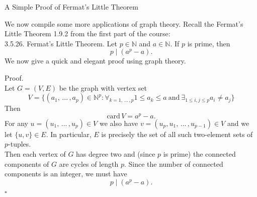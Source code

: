 \documentclass[smaller,hyperref={CJKbookmarks=true}]{beamer}
\newcommand{\N}{\mathbb{N}} \newcommand{\Z}{\mathbb{Z}} \newcommand{\Q}{\mathbb{Q}}
\newenvironment{PROOF}{{\noindent\!\sf\alert{Proof.}}\\}{\hfill$\square$\\}
\newcounter{zhuo}[subsection]
\begin{document}
\begin{frame}{A Simple Proof of Fermat's Little Theorem}
\begin{spacing}{1.05}
\vspace*{11pt}
We now compile some more applications of graph theory. Recall the
Fermat's Little Theorem 1.9.2 from the first part of the course:\\[6pt]
\alert{3.5.26. Fermat's Little Theorem.} Let $p\in\N$ and $a\in\N$. If $p$ is prime, then
\begin{equation}\label{3.5.4}
p\mid(a^p-a).
\end{equation}
We now give a quick and elegant proof using graph theory.
\end{spacing}
\newpage
\begin{spacing}{0.9}
\begin{PROOF}
Let $G=(V,E)$ be the graph with vertex set
\[V=\Big\{(a_1,\,...\,,a_p)\in\N^p\!:\mathop{\forall}_{k=1,\,...\,,p}
1\leq a_k\leq a~\text{and}~\mathop{\exists}_{1\leq i,j\leq p}a_i\neq a_j\Big\}\]
Then
\[\text{card}\,V=a^p-a.\]
For any $u=(u_1,\,...\,,u_p)\in V$ we also have $v=(u_p,u_1,\,...\,,u_{p-1})\in V$ and we let $\{u,v\}\in E$. In particular, $E$ is precisely the set of all such two-element sets of $p$-tuples.\\
Then each vertex of $G$ has degree two and (since $p$ is prime) the
connected components of $G$ are cycles of length $p$. Since the number of
connected components is an integer, we must have
\[p\mid(a^p-a).\]
\end{PROOF}
\end{spacing}
\end{frame}
\end{document}
